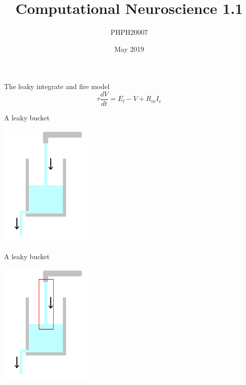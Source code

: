 \documentclass{beamer}
\title[Computational Neuroscience 1.1]{Computational Neuroscience 1.1}
\author{PHPH20007}
\institute{\texttt{github.com/conorhoughton/PHPH20007}}
\date{May 2019}
\begin{document}
\maketitle

\begin{frame}{The leaky integrate and fire model}
\color{black}
\color{reddish}
$$
\tau \frac{dV}{dt}=E_l-V+R_mI_e
$$
\color{black}
\end{frame}

\begin{frame}{A leaky bucket}

  \begin{center}
    \includegraphics[height=6cm]{glass.png}
  \end{center}
  
  
\end{frame}



\begin{frame}{A leaky bucket}

  \begin{center}
    \includegraphics[height=6cm]{glass_in.png}
  \end{center}
  
  
\end{frame}
\end{document}
